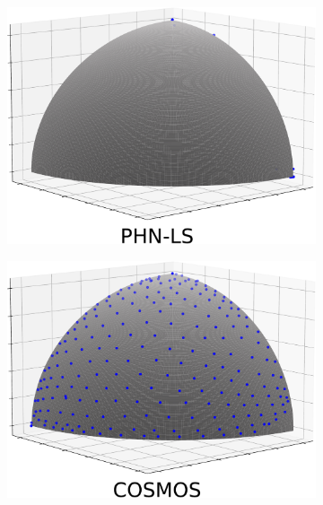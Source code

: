 \documentclass[letterpaper]{article} %
\begin{document}
\begin{figure}[!htb]
     \centering
     \begin{subfigure}[b]{0.24\textwidth}
         \centering
         \includegraphics[width=\textwidth]{figures/Toy_4_PHN-LS.pdf}
     \end{subfigure}
     \hfill
     \begin{subfigure}[b]{0.24\textwidth}
         \centering
         \includegraphics[width=\textwidth]{figures/Toy_4_COSMOS.pdf}
     \end{subfigure}
     \hfill
     \begin{subfigure}[b]{0.24\textwidth}
         \centering

\end{subfigure}
\end{figure}
\end{document}
